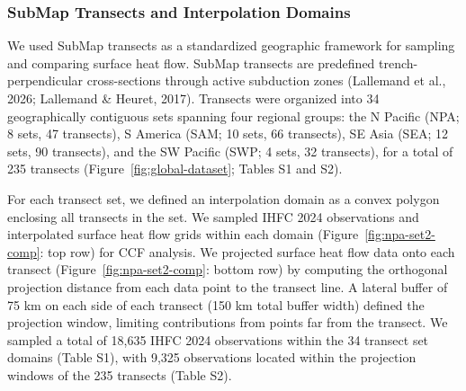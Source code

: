\documentclass[draft,linenumbers]{agujournal2019}
\begin{document}
\subsubsection{SubMap Transects and Interpolation
Domains}\label{sec:submap-transects}

We used SubMap transects as a standardized geographic framework for
sampling and comparing surface heat flow. SubMap transects are
predefined trench-perpendicular cross-sections through active subduction
zones ({Lallemand et al.}, 2026; Lallemand \& Heuret, 2017). Transects
were organized into 34 geographically contiguous sets spanning four
regional groups: the N Pacific (NPA; 8 sets, 47 transects), S America
(SAM; 10 sets, 66 transects), SE Asia (SEA; 12 sets, 90 transects), and
the SW Pacific (SWP; 4 sets, 32 transects), for a total of 235 transects
(Figure~\ref{fig:global-dataset}; Tables S1 and S2).

For each transect set, we defined an interpolation domain as a convex
polygon enclosing all transects in the set. We sampled IHFC 2024
observations and interpolated surface heat flow grids within each domain
(Figure~\ref{fig:npa-set2-comp}: top row) for CCF analysis. We projected
surface heat flow data onto each transect
(Figure~\ref{fig:npa-set2-comp}: bottom row) by computing the orthogonal
projection distance from each data point to the transect line. A lateral
buffer of 75 km on each side of each transect (150 km total buffer
width) defined the projection window, limiting contributions from points
far from the transect. We sampled a total of 18,635 IHFC 2024
observations within the 34 transect set domains (Table S1), with 9,325
observations located within the projection windows of the 235 transects
(Table S2).
\end{document}
